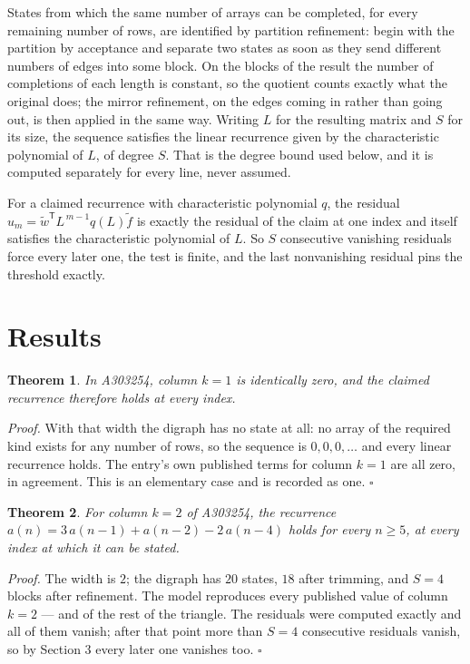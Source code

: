 \documentclass[11pt]{article}
\newtheorem{theorem}{Theorem}
\theoremstyle{definition}
\begin{document}
States from which the same number of arrays can be completed, for every remaining number of rows, are identified by partition refinement: begin with the partition by acceptance and separate two states as soon as they send different numbers of edges into some block. On the blocks of the result the number of completions of each length is constant, so the quotient counts exactly what the original does; the mirror refinement, on the edges coming in rather than going out, is then applied in the same way. Writing $L$ for the resulting matrix and $S$ for its size, the sequence satisfies the linear recurrence given by the characteristic polynomial of $L$, of degree $S$. That is the degree bound used below, and it is computed separately for every line, never assumed.

For a claimed recurrence with characteristic polynomial $q$, the residual $u_m = \tilde w^{\mathsf T}L^{\,m-1}q(L)\tilde f$ is exactly the residual of the claim at one index and itself satisfies the characteristic polynomial of $L$. So $S$ consecutive vanishing residuals force every later one, the test is finite, and the last nonvanishing residual pins the threshold exactly.

\section{Results}

\begin{theorem} In A303254, column $k = 1$ is identically zero, and the claimed recurrence therefore holds at every index.\end{theorem}

{\itshape Proof.} With that width the digraph has no state at all: no array of the required kind exists for any number of rows, so the sequence is $0,0,0,\dots$ and every linear recurrence holds. The entry's own published terms for column $k = 1$ are all zero, in agreement. This is an elementary case and is recorded as one. $\square$

\begin{theorem} For column $k = 2$ of A303254, the recurrence $a(n) = 3\,a(n-1) + a(n-2) - 2\,a(n-4)$ holds for every $n \ge 5$, at every index at which it can be stated.\end{theorem}

{\itshape Proof.} The width is $2$; the digraph has $20$ states, $18$ after trimming, and $S = 4$ blocks after refinement. The model reproduces every published value of column $k = 2$ --- and of the rest of the triangle. The residuals were computed exactly and all of them vanish; after that point more than $S = 4$ consecutive residuals vanish, so by Section 3 every later one vanishes too. $\square$
\end{document}
